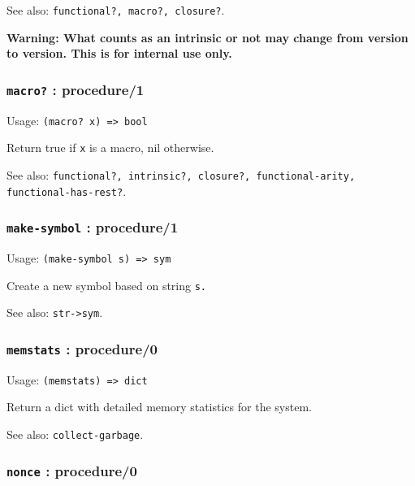 \documentclass[
]{article}
\newcommand{\passthrough}[1]{#1}
\begin{document}
See also: \passthrough{\lstinline!functional?, macro?, closure?!}.

\textbf{Warning: What counts as an intrinsic or not may change from
version to version. This is for internal use only.}

\hypertarget{macro-procedure1}{%
\subsubsection{\texorpdfstring{\texttt{macro?} :
procedure/1}{macro? : procedure/1}}\label{macro-procedure1}}

Usage: \passthrough{\lstinline!(macro? x) => bool!}

Return true if \passthrough{\lstinline!x!} is a macro, nil otherwise.

See also:
\passthrough{\lstinline!functional?, intrinsic?, closure?, functional-arity, functional-has-rest?!}.

\hypertarget{make-symbol-procedure1}{%
\subsubsection{\texorpdfstring{\texttt{make-symbol} :
procedure/1}{make-symbol : procedure/1}}\label{make-symbol-procedure1}}

Usage: \passthrough{\lstinline!(make-symbol s) => sym!}

Create a new symbol based on string \passthrough{\lstinline!s.!}

See also: \passthrough{\lstinline!str->sym!}.

\hypertarget{memstats-procedure0}{%
\subsubsection{\texorpdfstring{\texttt{memstats} :
procedure/0}{memstats : procedure/0}}\label{memstats-procedure0}}

Usage: \passthrough{\lstinline!(memstats) => dict!}

Return a dict with detailed memory statistics for the system.

See also: \passthrough{\lstinline!collect-garbage!}.

\hypertarget{nonce-procedure0}{%
\subsubsection{\texorpdfstring{\texttt{nonce} :
procedure/0}{nonce : procedure/0}}\label{nonce-procedure0}}
\end{document}
